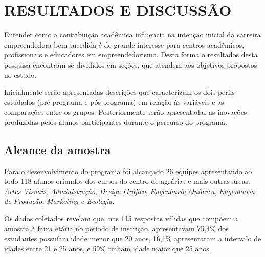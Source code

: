 \chapter{RESULTADOS E DISCUSSÃO}

Entender como a contribuição acadêmica influencia na intenção inicial da carreira empreendedora bem-sucedida é de grande interesse para centros acadêmicos, profissionais e educadores em empreendedorismo. 
Desta forma o resultados desta pesquisa encontram-se divididos em seções, que atendem aos objetivos propostos no estudo. 

Inicialmente serão apresentadas descrições que caracterizam os dois perfis estudados (pré-programa  e pós-programa) em relação às variáveis e as comparações entre os grupos.
Posteriormente serão apresentadas as inovações produzidas pelos alunos participantes durante o percurso do programa.

\section{Alcance da amostra}

Para o desenvolvimento do programa foi alcançado 26 equipes apresentando ao todo 118 alunos oriundos dos cursos do centro de agrárias e mais outras áreas: \textit{Artes Visuais}, \textit{Administração}, \textit{Design Gráfico}, \textit{Engenharia Química}, \textit{Engenharia de Produção}, \textit{Marketing e Ecologia}. 

Os dados coletados revelam que, nas 115 respostas válidas que compõem a amostra à faixa etária no período de inscrição, apresentavam 75,4\% dos estudantes possuíam idade menor que 20 anos, 16,1\% apresentaram a intervalo de idades entre 21 e 25 anos, e 59\% tinham idade maior que 25 anos.


